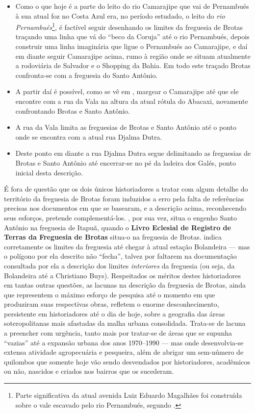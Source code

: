 \begin{itemize}
\item Como o que hoje é a parte do leito do rio Camarajipe que vai de Pernambués à sua atual foz no Costa Azul era, no período estudado, o leito do \textit{rio Pernambués}\footnote{Parte significativa da atual avenida Luiz Eduardo Magalhães foi construída sobre o vale escavado pelo rio Pernambués, segundo \cite{santos_aguas_2010}.}, é factível seguir desenhando os limites da freguesia de Brotas traçando uma linha que vá do ``beco da Coruja'' até o rio Pernambués, depois construir uma linha imaginária que ligue o Pernambués ao Camarajipe, e daí em diante seguir Camarajipe acima, rumo à região onde se situam atualmente a rodoviária de Salvador e o Shopping da Bahia. Em todo este traçado Brotas confronta-se com a freguesia do Santo Antônio.
\item A partir daí é possível, como se vê em , margear o Camarajipe até que ele encontre com a rua da Vala na altura da atual rótula do Abacaxi, novamente confrontando Brotas e Santo Antônio.
\item A rua da Vala limita as freguesias de Brotas e Santo Antônio até o ponto onde se encontra com a atual rua Djalma Dutra.
\item Deste ponto em diante a rua Djalma Dutra segue delimitando as freguesias de Brotas e Santo Antônio até encerrar-se no pé da ladeira dos Galés, ponto inicial desta descrição.
\end{itemize}

É fora de questão que os dois únicos historiadores a tratar com algum detalhe do território da freguesia de Brotas \cite{NASCIMENTO2007,ott_engenhos_1996} foram induzidos a erro pela falta de referências precisas nos documentos em que se basearam, e a descrição acima, reconhecendo seus esforços, pretende complementá-los. , por sua vez, situa o engenho Santo Antônio na freguesia de Itapuã, quando o \textbf{Livro Eclesial de Registro de Terras da Freguesia de Brotas} situa-o na freguesia de Brotas.  indica corretamente os limites da freguesia até chegar à atual estação Bolandeira --- mas o polígono por ela descrito não ``fecha'', talvez por faltarem na documentação consultada por ela a descrição dos limites \textit{interiores} da freguesia (ou seja, da Bolandeira até a Christiano Buys). Respeitados os méritos destes historiadores em tantas outras questões, as lacunas na descrição da freguesia de Brotas, ainda que representem o máximo esforço de pesquisa até o momento em que produziram suas respectivas obras, refletem o enorme desconhecimento, persistente em historiadores até o dia de hoje, sobre a geografia das áreas soteropolitanas mais afastadas da malha urbana consolidada. Trata-se de lacuna a preencher com urgência, tanto mais por tratar-se de áreas que se supunha ``vazias'' até a expansão urbana dos anos 1970--1990 --- mas onde desenvolvia-se extensa atividade agropecuária e pesqueira, além de abrigar um sem-número de quilombos que somente hoje vão sendo desvendados por historiadores, acadêmicos ou não, nascidos e criados nos bairros que os sucederam.


